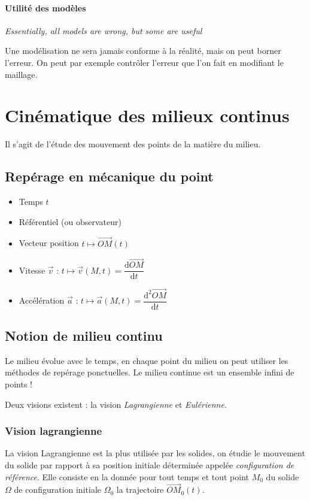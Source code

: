 \documentclass{article}
\newcommand{\deriv}{\mathrm{d}}
\begin{document}
\paragraph{Utilité des modèles} \emph{Essentially, all models are wrong, but some are useful}

Une modélisation ne sera jamais conforme à la réalité, mais on peut borner l'erreur. On peut par exemple contrôler l'erreur que l'on fait en modifiant le maillage.


\section{Cinématique des milieux continus}
Il s'agit de l'étude des mouvement des points de la matière du milieu.

\subsection{Repérage en mécanique du point}
\begin{itemize}[label=\textbullet]
\item Temps $t$
\item Référentiel (ou observateur)
\item Vecteur position $t \mapsto \overrightarrow{OM}(t)$
\item Vitesse $\vec{v}$ : $t \mapsto \vec{v}(M,t) = \dfrac{\deriv \overrightarrow{OM}}{\deriv t}$
\item Accélération $\vec{a}$ : $t \mapsto \vec{a}(M,t) = \dfrac{\deriv^2 \overrightarrow{OM}}{\deriv t}$
\end{itemize}

\subsection{Notion de milieu continu}
Le milieu évolue avec le temps, en chaque point du milieu on peut utiliser les méthodes de repérage ponctuelles. Le milieu continue est un ensemble infini de points !

Deux visions existent : la vision \emph{Lagrangienne} et \emph{Eulérienne}.

\subsubsection{Vision lagrangienne}
La vision Lagrangienne est la plus utilisée par les solides, on étudie le mouvement du solide par rapport à sa position initiale déterminée appelée \emph{configuration de référence}. Elle consiste en la donnée pour tout temps et tout point $M_0$ du solide $\Omega$ de configuration initiale $\Omega_0$ la trajectoire $\overrightarrow{OM}_0(t)$.
\end{document}
